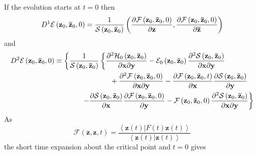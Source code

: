 \documentclass[aps,preprint]{revtex4}
\begin{document}
If the evolution starts at $t=0$ then 
\begin{equation}
D^{1}\mathcal{E}\left( \mathbf{z}_{0},\mathbf{\bar{z}}_{0},0\right) =\frac{1%
}{\mathcal{S}\left( \mathbf{z}_{0},\mathbf{\bar{z}}_{0}\right) }\left( \frac{%
\partial \mathcal{F}\left( \mathbf{z}_{0},\mathbf{\bar{z}}_{0},0\right) }{%
\partial \mathbf{z}},\frac{\partial \mathcal{F}\left( \mathbf{z}_{0},\mathbf{%
\bar{z}}_{0},0\right) }{\partial \mathbf{\bar{z}}}\right)
\end{equation}%
and 
\begin{align}
& D^{2}\mathcal{E}\left( \mathbf{z}_{0},\mathbf{\bar{z}}_{0},0\right) \equiv
\left\{ \frac{1}{\mathcal{S}\left( \mathbf{z}_{0},\mathbf{\bar{z}}%
_{0}\right) }\left\{ \frac{\partial ^{2}\mathcal{H}_{0}\left( \mathbf{z}_{0},%
\mathbf{\bar{z}}_{0}\right) }{\partial \mathbf{x}\partial \mathbf{y}}-%
\mathcal{E}_{0}\left( \mathbf{z}_{0},\mathbf{\bar{z}}_{0}\right) \frac{%
\partial ^{2}\mathcal{S}\left( \mathbf{z}_{0},\mathbf{\bar{z}}_{0}\right) }{%
\partial \mathbf{x}\partial \mathbf{y}}\right. \right.  \notag \\
& \qquad \qquad \qquad \qquad \qquad \qquad \qquad +\frac{\partial ^{2}%
\mathcal{F}\left( \mathbf{z}_{0},\mathbf{\bar{z}}_{0},0\right) }{\partial 
\mathbf{x}\partial \mathbf{y}}-\frac{\partial \mathcal{F}\left( \mathbf{z}%
_{0},\mathbf{\bar{z}}_{0},t\right) }{\partial \mathbf{x}}\frac{\partial 
\mathcal{S}\left( \mathbf{z}_{0},\mathbf{\bar{z}}_{0}\right) }{\partial 
\mathbf{y}}  \notag \\
& \qquad \qquad \qquad \qquad \qquad \left. -\frac{\partial \mathcal{S}%
\left( \mathbf{z}_{0},\mathbf{\bar{z}}_{0}\right) }{\partial \mathbf{x}}%
\frac{\partial \mathcal{F}\left( \mathbf{z}_{0},\mathbf{\bar{z}}%
_{0},0\right) }{\partial \mathbf{y}}-\mathcal{F}\left( \mathbf{z}_{0},%
\mathbf{\bar{z}}_{0},0\right) \frac{\partial ^{2}\mathcal{S}\left( \mathbf{z}%
_{0},\mathbf{\bar{z}}_{0}\right) }{\partial \mathbf{x}\partial \mathbf{y}}%
\right\}
\end{align}%
As%
\begin{equation}
\mathcal{F}\left( \mathbf{\bar{z}},\mathbf{z},t\right) =\frac{\left\langle
\left. \mathbf{z}\left( t\right) \right\vert F\left( t\right) \mathbf{z}%
\left( t\right) \right\rangle }{\left\langle \left. \mathbf{z}\left(
t\right) \right\vert \mathbf{z}\left( t\right) \right\rangle }
\end{equation}%
the short time expansion about the critical point and $t=0$ gives 
\end{document}

